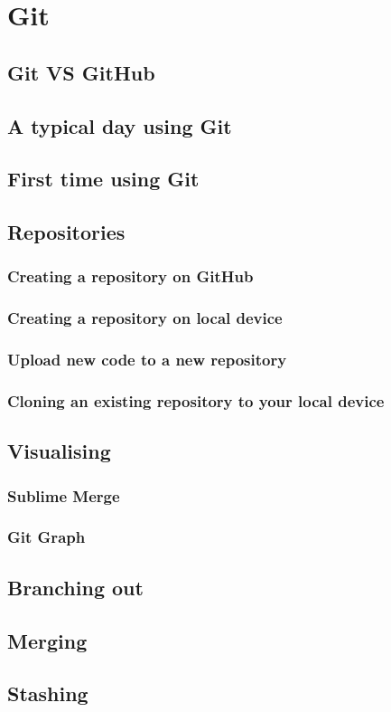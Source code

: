 \chapter{Git}

\section{Git VS GitHub}

\section{A typical day using Git}

\section{First time using Git}

\section{Repositories}

\subsection{Creating a repository on GitHub}

\subsection{Creating a repository on local device}

\subsection{Upload new code to a new repository}

\subsection{Cloning an existing repository to your local device}

\section{Visualising}

\subsection*{Sublime Merge}

\subsection*{Git Graph}

\section{Branching out}

\section{Merging}

\section{Stashing}
